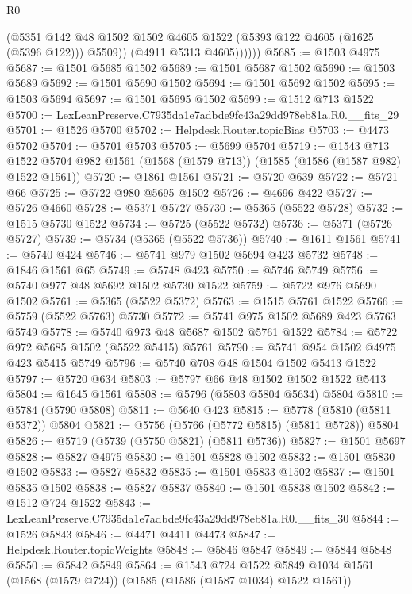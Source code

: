 \begin{lexlean}{R0}
\begin{coremodule}
                (@5351
                  @142
                  @48
                  @1502
                  @1502
                  @4605
                  @1522
                  (@5393 @122 @4605 (@1625 (@5396 @122)))
                  @5509))
              (@4911 @5313 @4605))))))
@5685 := @1503 @4975
@5687 := @1501 @5685 @1502
@5689 := @1501 @5687 @1502
@5690 := @1503 @5689
@5692 := @1501 @5690 @1502
@5694 := @1501 @5692 @1502
@5695 := @1503 @5694
@5697 := @1501 @5695 @1502
@5699 := @1512 @713 @1522
@5700 := LexLeanPreserve.C7935da1e7adbde9fc43a29dd978eb81a.R0.__fits_29
@5701 := @1526 @5700
@5702 := Helpdesk.Router.topicBias
@5703 := @4473 @5702
@5704 := @5701 @5703
@5705 := @5699 @5704
@5719 := @1543
    @713
    @1522
    @5704
    @982
    @1561
    (@1568 (@1579 @713))
    (@1585 (@1586 (@1587 @982) @1522 @1561))
@5720 := @1861 @1561
@5721 := @5720 @639
@5722 := @5721 @66
@5725 := @5722 @980 @5695 @1502
@5726 := @4696 @422
@5727 := @5726 @4660
@5728 := @5371 @5727
@5730 := @5365 (@5522 @5728)
@5732 := @1515 @5730 @1522
@5734 := @5725 (@5522 @5732)
@5736 := @5371 (@5726 @5727)
@5739 := @5734 (@5365 (@5522 @5736))
@5740 := @1611 @1561
@5741 := @5740 @424
@5746 := @5741 @979 @1502 @5694 @423 @5732
@5748 := @1846 @1561 @65
@5749 := @5748 @423
@5750 := @5746 @5749
@5756 := @5740 @977 @48 @5692 @1502 @5730 @1522
@5759 := @5722 @976 @5690 @1502
@5761 := @5365 (@5522 @5372)
@5763 := @1515 @5761 @1522
@5766 := @5759 (@5522 @5763) @5730
@5772 := @5741 @975 @1502 @5689 @423 @5763 @5749
@5778 := @5740 @973 @48 @5687 @1502 @5761 @1522
@5784 := @5722 @972 @5685 @1502 (@5522 @5415) @5761
@5790 := @5741 @954 @1502 @4975 @423 @5415 @5749
@5796 := @5740 @708 @48 @1504 @1502 @5413 @1522
@5797 := @5720 @634
@5803 := @5797 @66 @48 @1502 @1502 @1522 @5413
@5804 := @1645 @1561
@5808 := @5796 (@5803 @5804 @5634) @5804
@5810 := @5784 (@5790 @5808)
@5811 := @5640 @423
@5815 := @5778 (@5810 (@5811 @5372)) @5804
@5821 := @5756 (@5766 (@5772 @5815) (@5811 @5728)) @5804
@5826 := @5719 (@5739 (@5750 @5821) (@5811 @5736))
@5827 := @1501 @5697
@5828 := @5827 @4975
@5830 := @1501 @5828 @1502
@5832 := @1501 @5830 @1502
@5833 := @5827 @5832
@5835 := @1501 @5833 @1502
@5837 := @1501 @5835 @1502
@5838 := @5827 @5837
@5840 := @1501 @5838 @1502
@5842 := @1512 @724 @1522
@5843 := LexLeanPreserve.C7935da1e7adbde9fc43a29dd978eb81a.R0.__fits_30
@5844 := @1526 @5843
@5846 := @4471 @4411 @4473
@5847 := Helpdesk.Router.topicWeights
@5848 := @5846 @5847
@5849 := @5844 @5848
@5850 := @5842 @5849
@5864 := @1543
    @724
    @1522
    @5849
    @1034
    @1561
    (@1568 (@1579 @724))
    (@1585 (@1586 (@1587 @1034) @1522 @1561))

\end{coremodule}
\end{lexlean}

